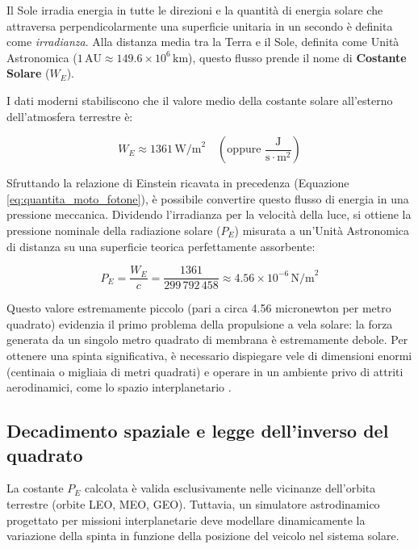 Il Sole irradia energia in tutte le direzioni e la quantità di energia solare che attraversa perpendicolarmente una superficie unitaria in un secondo è definita come \textit{irradianza}. Alla distanza media tra la Terra e il Sole, definita come Unità Astronomica ($1 \, \text{AU} \approx 149.6 \times 10^6 \, \text{km}$), questo flusso prende il nome di \textbf{Costante Solare} ($W_E$). 

I dati moderni stabiliscono che il valore medio della costante solare all'esterno dell'atmosfera terrestre è:

\begin{equation}
    W_E \approx 1361 \, \text{W/m}^2 \quad \left( \text{oppure } \frac{\text{J}}{\text{s} \cdot \text{m}^2} \right)
\end{equation}

Sfruttando la relazione di Einstein ricavata in precedenza (Equazione \ref{eq:quantita_moto_fotone}), è possibile convertire questo flusso di energia in una pressione meccanica. Dividendo l'irradianza per la velocità della luce, si ottiene la pressione nominale della radiazione solare ($P_E$) misurata a un'Unità Astronomica di distanza su una superficie teorica perfettamente assorbente:

\begin{equation} \label{eq:pressione_terrestre}
    P_E = \frac{W_E}{c} = \frac{1361}{299\,792\,458} \approx 4.56 \times 10^{-6} \, \text{N/m}^2
\end{equation}

Questo valore estremamente piccolo (pari a circa 4.56 micronewton per metro quadrato) evidenzia il primo problema della propulsione a vela solare: la forza generata da un singolo metro quadrato di membrana è estremamente debole. Per ottenere una spinta significativa, è necessario dispiegare vele di dimensioni enormi (centinaia o migliaia di metri quadrati) e operare in un ambiente privo di attriti aerodinamici, come lo spazio interplanetario \cite{rodrigues2023review, mcinnes1999solar}.


\subsection{Decadimento spaziale e legge dell'inverso del quadrato}
La costante $P_E$ calcolata è valida esclusivamente nelle vicinanze dell'orbita terrestre (orbite LEO, MEO, GEO). Tuttavia, un simulatore astrodinamico progettato per missioni interplanetarie deve modellare dinamicamente la variazione della spinta in funzione della posizione del veicolo nel sistema solare.


